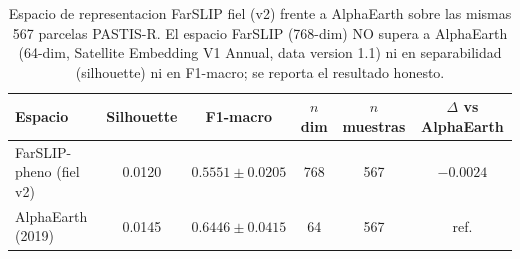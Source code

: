 \begin{table}[htbp]
\caption{Espacio de representacion FarSLIP fiel (v2) frente a AlphaEarth sobre
las mismas 567 parcelas PASTIS-R. El espacio FarSLIP (768-dim) NO supera a
AlphaEarth (64-dim, Satellite Embedding V1 Annual, data version 1.1) ni en
separabilidad (silhouette) ni en F1-macro; se reporta el resultado honesto.}
\label{tab:farslip_vs_alphaearth}
\centering
\begin{tabular}{lccccc}
\toprule
\textbf{Espacio} & \textbf{Silhouette} & \textbf{F1-macro} & \textbf{$n$ dim} & \textbf{$n$ muestras} & \textbf{$\Delta$ vs AlphaEarth} \\
\midrule
FarSLIP-pheno (fiel v2) & 0.0120 & $0.5551 \pm 0.0205$ & 768 & 567 & $-0.0024$ \\
AlphaEarth (2019)       & 0.0145 & $0.6446 \pm 0.0415$ &  64 & 567 & ref. \\
\bottomrule
\end{tabular}
\end{table}
